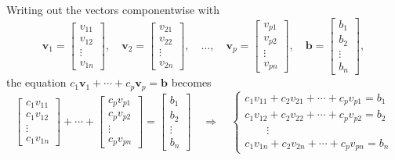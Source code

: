 Writing out the vectors componentwise with
\[
  \mathbf{v}_1 =
  \begin{bmatrix}
    v_{11} \\ v_{12} \\ \vdots \\ v_{1n}
  \end{bmatrix}
  , \quad
  \mathbf{v}_2 =
  \begin{bmatrix}
    v_{21} \\ v_{22} \\ \vdots \\ v_{2n}
  \end{bmatrix}
  , \quad \ldots, \quad
  \mathbf{v}_p =
  \begin{bmatrix}
    v_{p1} \\ v_{p2} \\ \vdots \\ v_{pn}
  \end{bmatrix}
  , \quad
  \mathbf{b} =
  \begin{bmatrix}
    b_1 \\ b_2 \\ \vdots \\ b_n
  \end{bmatrix}
  ,
\]
the equation $c_1 \mathbf{v}_1 + \cdots + c_p \mathbf{v}_p = \mathbf{b}$ becomes
\[
  \begin{bmatrix}
    c_1 v_{11} \\ c_1 v_{12} \\ \vdots \\ c_1 v_{1n}
  \end{bmatrix}
  + \cdots +
  \begin{bmatrix}
    c_p v_{p1} \\ c_p v_{p2} \\ \vdots \\ c_p v_{pn}
  \end{bmatrix}
  =
  \begin{bmatrix}
    b_1 \\ b_2 \\ \vdots \\ b_n
  \end{bmatrix}
  \quad \Longrightarrow \quad
  \begin{cases}
    c_1 v_{11} + c_2 v_{21} + \cdots + c_p v_{p1} = b_1 \\
    c_1 v_{12} + c_2 v_{22} + \cdots + c_p v_{p2} = b_2 \\
    \hspace{2em}\vdots                                  \\
    c_1 v_{1n} + c_2 v_{2n} + \cdots + c_p v_{pn} = b_n
  \end{cases}
\]
